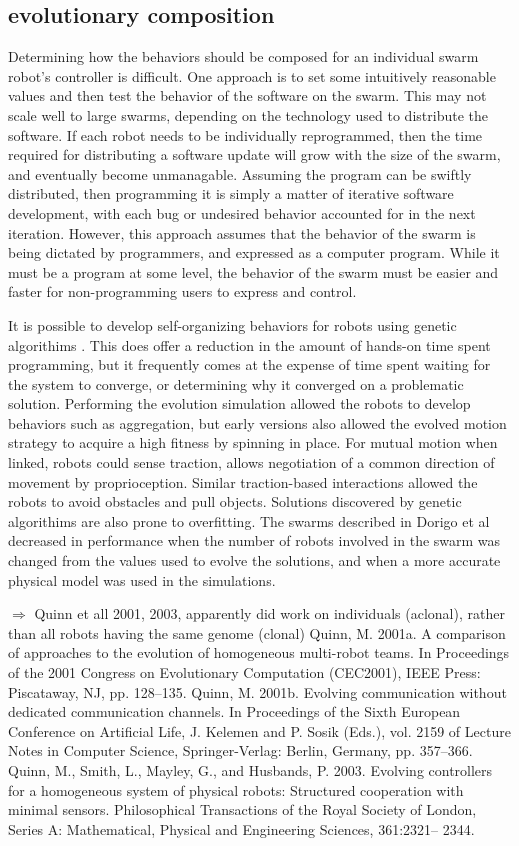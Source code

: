 \documentclass[]{article}
\begin{document}
\subsection{evolutionary composition}

Determining how the behaviors should be composed for an individual swarm robot's controller is difficult. 
One approach is to set some intuitively reasonable values and then test the behavior of the software on the swarm. 
This may not scale well to large swarms, depending on the technology used to distribute the software. 
If each robot needs to be individually reprogrammed, then the time required for distributing a software update will grow with the size of the swarm, and eventually become unmanagable. 
Assuming the program can be swiftly distributed, then programming it is simply a matter of iterative software development, with each bug or undesired behavior accounted for in the next iteration. 
However, this approach assumes that the behavior of the swarm is being dictated by programmers, and expressed as a computer program. 
While it must be a program at some level, the behavior of the swarm must be easier and faster for non-programming users to express and control. 
 
It is possible to develop self-organizing behaviors for robots using genetic algorithims \cite{dorigo2004evolving}. 
This does offer a reduction in the amount of hands-on time spent programming, but it frequently comes at the expense of time spent waiting for the system to converge, or determining why it converged on a problematic solution. 
Performing the evolution simulation allowed the robots to develop behaviors such as aggregation, but early versions also allowed the evolved motion strategy to acquire a high fitness by spinning in place. 
For mutual motion when linked, robots could sense traction, allows negotiation of a common direction of movement by proprioception. 
Similar traction-based interactions allowed the robots to avoid obstacles and pull objects. 
Solutions discovered by genetic algorithims are also prone to overfitting. 
The swarms described in Dorigo et al decreased in performance when the number of robots involved in the swarm was changed from the values used to evolve the solutions, and when a more accurate physical model was used in the simulations.

$\Rightarrow$ Quinn et all 2001, 2003, apparently did work on individuals (aclonal), rather than all robots having the same genome (clonal) Quinn, M. 2001a. A comparison of approaches to the evolution of homogeneous multi-robot teams. In Proceedings of the 2001 Congress on Evolutionary Computation (CEC2001), IEEE Press: Piscataway, NJ, pp. 128–135.
Quinn, M. 2001b. Evolving communication without dedicated communication channels. In Proceedings of the Sixth European Conference on Artificial Life, J. Kelemen and P. Sosik (Eds.), vol. 2159 of Lecture Notes in Computer Science, Springer-Verlag: Berlin, Germany, pp. 357–366.
Quinn, M., Smith, L., Mayley, G., and Husbands, P. 2003. Evolving controllers for a homogeneous system of physical robots: Structured cooperation with minimal sensors. Philosophical Transactions of the Royal Society of London, Series A: Mathematical, Physical and Engineering Sciences, 361:2321– 2344.
\end{document}
